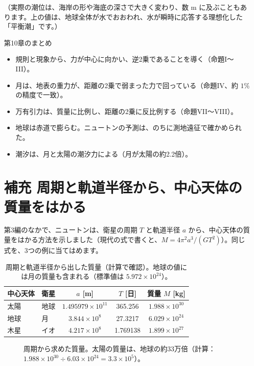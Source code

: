 \documentclass[a4paper,11pt,openany]{ltjsbook}
\begin{document}
（実際の潮位は、海岸の形や海底の深さで大きく変わり、数 m に及ぶこともあります。上の値は、地球全体が水でおおわれ、水が瞬時に応答する理想化した「平衡潮」です。）

\begin{pointbox}{第10章のまとめ}
\begin{itemize}[leftmargin=1.5em]
\item 規則と現象から、力が中心に向かい、逆2乗であることを導く（命題I〜III）。
\item 月は、地表の重力が、距離の2乗で弱まった力で回っている（命題IV、約 $1\%$ の精度で一致）。
\item 万有引力は、質量に比例し、距離の2乗に反比例する（命題VII〜VIII）。
\item 地球は赤道で膨らむ。ニュートンの予測は、のちに測地遠征で確かめられた。
\item 潮汐は、月と太陽の潮汐力による（月が太陽の約2.2倍）。
\end{itemize}
\end{pointbox}

\section{補充 周期と軌道半径から、中心天体の質量をはかる}

第3編のなかで、ニュートンは、衛星の周期 $T$ と軌道半径 $a$ から、中心天体の質量をはかる方法を示しました（現代の式で書くと、$M=4\pi^2a^3/(GT^2)$）。同じ式を、3つの例に当てはめます。

\begin{table}[htbp]
\centering
\begin{tabular}{llccc}
\toprule
中心天体 & 衛星 & $a$ [m] & $T$ [日] & 質量 $M$ [kg]\\
\midrule
太陽 & 地球 & $1.495979\times10^{11}$ & 365.256 & $1.988\times10^{30}$\\
地球 & 月 & $3.844\times10^{8}$ & 27.3217 & $6.029\times10^{24}$\\
木星 & イオ & $4.217\times10^{8}$ & 1.769138 & $1.899\times10^{27}$\\
\bottomrule
\end{tabular}
\caption{周期と軌道半径から出した質量（計算で確認）。地球の値には月の質量も含まれる（標準値は $5.972\times10^{24}$）。}
\end{table}

\begin{figure}[htbp]
\centering
{}
\caption{周期から求めた質量。太陽の質量は、地球の約33万倍（計算：$1.988\times10^{30}\div6.03\times10^{24}=3.3\times10^5$）。}
\end{figure}
\end{document}
